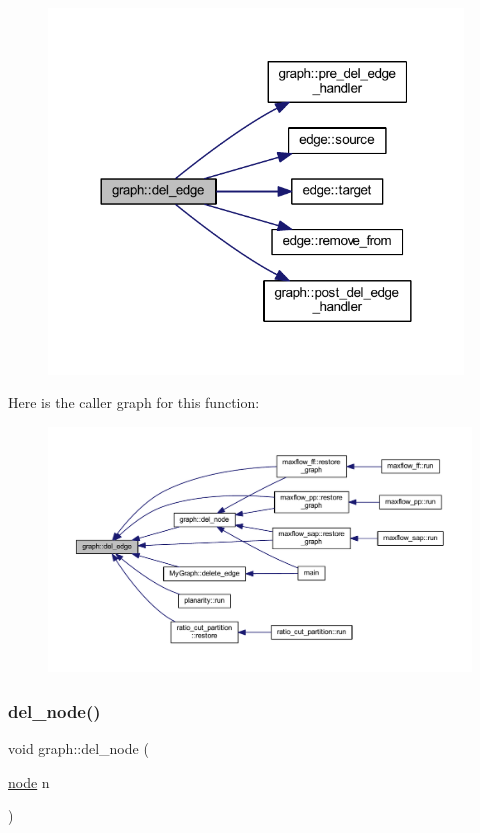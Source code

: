 \begin{figure}[H]
\begin{center}
\leavevmode
\includegraphics[width=312pt]{classgraph_ad9356508c49c542dfd4b7169297387c6_cgraph}
\end{center}
\end{figure}
Here is the caller graph for this function\+:\nopagebreak
\begin{figure}[H]
\begin{center}
\leavevmode
\includegraphics[width=350pt]{classgraph_ad9356508c49c542dfd4b7169297387c6_icgraph}
\end{center}
\end{figure}
\mbox{\label{classgraph_a8bdc09d5b9ac4bd26586b054d8fcbe91}} 
\subsubsection{\texorpdfstring{del\+\_\+node()}{del\_node()}}
{\footnotesize\ttfamily void graph\+::del\+\_\+node (\begin{DoxyParamCaption}\item[{\mbox{\hyperlink{classnode}{node}}}]{n }\end{DoxyParamCaption})\hspace{0.3cm}{\ttfamily [inherited]}}

